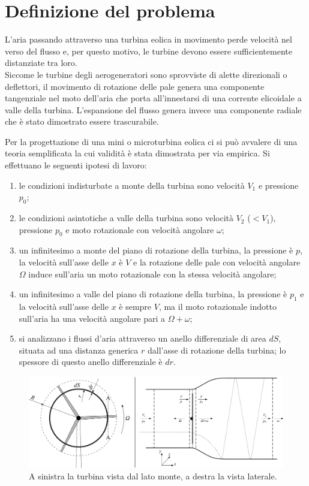 \section{Definizione del problema}
L'aria passando attraverso una turbina eolica in movimento perde velocità nel verso del flusso e, per questo motivo, le turbine devono essere sufficientemente distanziate tra loro.\\
Siccome le turbine degli aerogeneratori sono sprovviste di alette direzionali o deflettori, il movimento di rotazione delle pale genera una componente tangenziale nel moto dell'aria che porta all'innestarsi di una corrente elicoidale a valle della turbina. L'espansione del flusso genera invece una componente radiale che è stato dimostrato essere trascurabile.

Per la progettazione di una mini o microturbina eolica ci si può avvalere di una teoria semplificata la cui validità è stata dimostrata per via empirica. Si effettuano le seguenti ipotesi di lavoro:
\begin{enumerate}
\item le condizioni indisturbate a monte della turbina sono velocità $V_1$ e pressione $p_0$;
\item le condizioni asintotiche a valle della turbina sono velocità $V_2$ ($<V_1$), pressione $p_0$ e moto rotazionale con velocità angolare $\omega$;
\item un infinitesimo a monte del piano di rotazione della turbina, la pressione è $p$, la velocità sull'asse delle $x$ è $V$ e la rotazione delle pale con velocità angolare $\Omega$ induce sull'aria un moto rotazionale con la stessa velocità angolare;
\item un infinitesimo a valle del piano di rotazione della turbina, la pressione è $p_1$ e la velocità sull'asse delle $x$ è sempre $V$, ma il moto rotazionale indotto sull'aria ha una velocità angolare pari a $\Omega+\omega$;
\item si analizzano i flussi d'aria attraverso un anello differenziale di area $dS$, situata ad una distanza generica $r$ dall'asse di rotazione della turbina; lo spessore di questo anello differenziale è $dr$.
\end{enumerate}
\begin{figure}
\centering
  \includegraphics[width=\textwidth]{fig/frontlatEol.pdf}
\caption{A sinistra la turbina vista dal lato monte, a destra la vista laterale.}
\label{fig:frontlatEol}
\end{figure}
